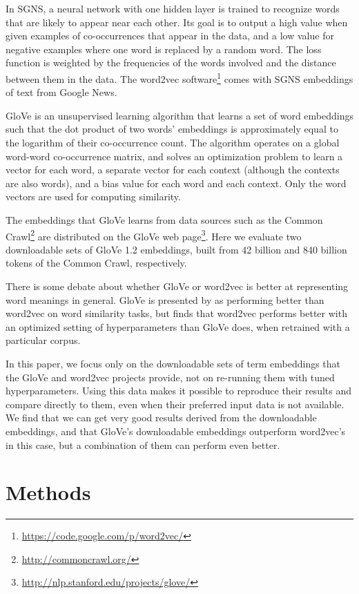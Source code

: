 \documentclass[11pt,letterpaper]{article}
\begin{document}
In SGNS, a neural network with one hidden layer is trained to recognize words
that are likely to appear near each other. Its goal is to output a high value
when given examples of co-occurrences that appear in the data, and a low value
for negative examples where one word is replaced by a random word. The loss
function is weighted by the frequencies of the words involved and the distance
between them in the data. The word2vec
software\footnote{\url{https://code.google.com/p/word2vec/}} comes with SGNS
embeddings of text from Google News.

GloVe \cite{pennington2014glove} is an unsupervised learning algorithm that
learns a set of word embeddings such that the dot product of two words'
embeddings is approximately equal to the logarithm of their co-occurrence count.
The algorithm operates on a global word-word co-occurrence matrix, and
solves an optimization problem to learn a vector for each word, a separate
vector for each context (although the contexts are also words), and a bias
value for each word and each context. Only the word vectors are used for
computing similarity.

The embeddings that GloVe learns from data sources such as the Common
Crawl\footnote{\url{http://commoncrawl.org/}} are distributed on the GloVe web
page\footnote{\url{http://nlp.stanford.edu/projects/glove/}}. Here we evaluate
two downloadable sets of GloVe 1.2 embeddings, built from 42 billion and 840
billion tokens of the Common Crawl, respectively.

There is some debate about whether GloVe or word2vec is better at representing
word meanings in general. GloVe is presented by 
as performing better than word2vec on word similarity tasks, but
 finds that word2vec performs better with an
optimized setting of hyperparameters than GloVe does, when retrained with a
particular corpus.

In this paper, we focus only on the downloadable sets of term embeddings that
the GloVe and word2vec projects provide, not on re-running them with tuned
hyperparameters. Using this data makes it possible to reproduce their results
and compare directly to them, even when their preferred input data is not
available. We find that we can get very good results derived from
the downloadable embeddings, and that GloVe's downloadable embeddings outperform
word2vec's in this case, but a combination of them can perform even better.

\section{Methods}
\end{document}
